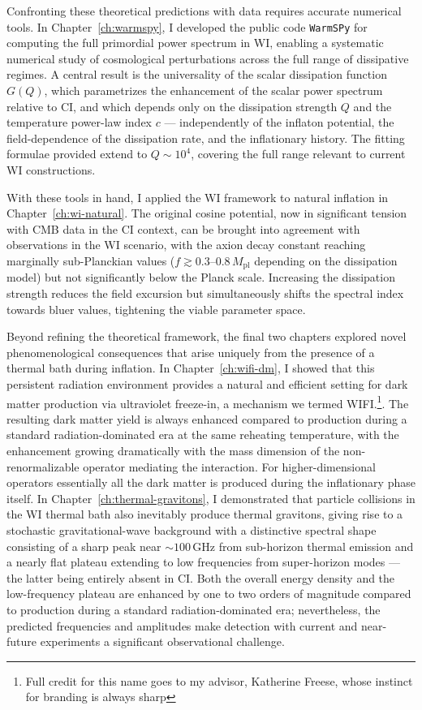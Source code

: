 Confronting these theoretical predictions with data requires accurate numerical tools. In Chapter~\ref{ch:warmspy}, I developed the public code \texttt{WarmSPy} for computing the full primordial power spectrum in WI, enabling a systematic numerical study of cosmological perturbations across the full range of dissipative regimes. A central result is the universality of the scalar dissipation function $G(Q)$, which parametrizes the enhancement of the scalar power spectrum relative to CI, and which depends only on the dissipation strength $Q$ and the temperature power-law index $c$ --- independently of the inflaton potential, the field-dependence of the dissipation rate, and the inflationary history. The fitting formulae provided extend to $Q \sim 10^4$, covering the full range relevant to current WI constructions.

With these tools in hand, I applied the WI framework to natural inflation in Chapter~\ref{ch:wi-natural}. The original cosine potential, now in significant tension with CMB data in the CI context, can be brought into agreement with observations in the WI scenario, with the axion decay constant reaching marginally sub-Planckian values ($f \gtrsim 0.3\text{--}0.8\,M_\mathrm{pl}$ depending on the dissipation model) but not significantly below the Planck scale. Increasing the dissipation strength reduces the field excursion but simultaneously shifts the spectral index towards bluer values, tightening the viable parameter space.


Beyond refining the theoretical framework, the final two chapters explored novel phenomenological consequences that arise uniquely from the presence of a thermal bath during inflation. In Chapter~\ref{ch:wifi-dm}, I showed that this persistent radiation environment provides a natural and efficient setting for dark matter production via ultraviolet freeze-in, a mechanism we termed WIFI.\footnote{Full credit for this name goes to my advisor, Katherine Freese, whose instinct for branding is always sharp}. The resulting dark matter yield is always enhanced compared to production during a standard radiation-dominated era at the same reheating temperature, with the enhancement growing dramatically with the mass dimension of the non-renormalizable operator mediating the interaction. For higher-dimensional operators essentially all the dark matter is produced during the inflationary phase itself. In Chapter~\ref{ch:thermal-gravitons}, I demonstrated that particle collisions in the WI thermal bath also inevitably produce thermal gravitons, giving rise to a stochastic gravitational-wave background with a distinctive spectral shape consisting of a sharp peak near $\sim 100\,$GHz from sub-horizon thermal emission and a nearly flat plateau extending to low frequencies from super-horizon modes --- the latter being entirely absent in CI. Both the overall energy density and the low-frequency plateau are enhanced by one to two orders of magnitude compared to production during a standard radiation-dominated era; nevertheless, the predicted frequencies and amplitudes make detection with current and near-future experiments a significant observational challenge.

